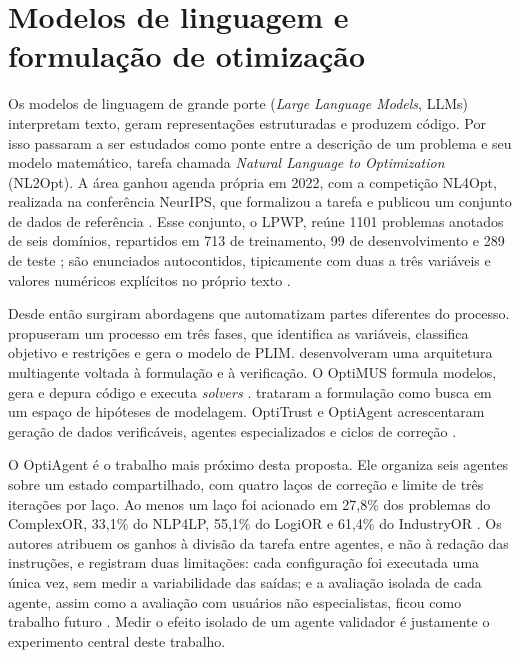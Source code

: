 \section{Modelos de linguagem e formulação de otimização}
\label{sec:nl2opt}

Os modelos de linguagem de grande porte (\textit{Large Language Models}, LLMs) interpretam texto, geram representações estruturadas e produzem código. Por isso passaram a ser estudados como ponte entre a descrição de um problema e seu modelo matemático, tarefa chamada \textit{Natural Language to Optimization} (NL2Opt). A área ganhou agenda própria em 2022, com a competição NL4Opt, realizada na conferência NeurIPS, que formalizou a tarefa e publicou um conjunto de dados de referência \cite{ramamonjison2023}. Esse conjunto, o LPWP, reúne 1101 problemas anotados de seis domínios, repartidos em 713 de treinamento, 99 de desenvolvimento e 289 de teste \cite{ramamonjison2023}; são enunciados autocontidos, tipicamente com duas a três variáveis e valores numéricos explícitos no próprio texto \cite{mostajabdaveh2024}.

Desde então surgiram abordagens que automatizam partes diferentes do processo.  propuseram um processo em três fases, que identifica as variáveis, classifica objetivo e restrições e gera o modelo de PLIM.  desenvolveram uma arquitetura multiagente voltada à formulação e à verificação. O OptiMUS formula modelos, gera e depura código e executa \textit{solvers} \cite{ahmaditeshnizi2024, ahmaditeshnizi2026}.  trataram a formulação como busca em um espaço de hipóteses de modelagem. OptiTrust e OptiAgent acrescentaram geração de dados verificáveis, agentes especializados e ciclos de correção \cite{lima2025, monteiro2026}.

O OptiAgent \cite{monteiro2026} é o trabalho mais próximo desta proposta. Ele organiza seis agentes sobre um estado compartilhado, com quatro laços de correção e limite de três iterações por laço. Ao menos um laço foi acionado em 27,8\% dos problemas do ComplexOR, 33,1\% do NLP4LP, 55,1\% do LogiOR e 61,4\% do IndustryOR \cite[p.~9]{monteiro2026}. Os autores atribuem os ganhos à divisão da tarefa entre agentes, e não à redação das instruções, e registram duas limitações: cada configuração foi executada uma única vez, sem medir a variabilidade das saídas; e a avaliação isolada de cada agente, assim como a avaliação com usuários não especialistas, ficou como trabalho futuro \cite[p.~11]{monteiro2026}. Medir o efeito isolado de um agente validador é justamente o experimento central deste trabalho.

